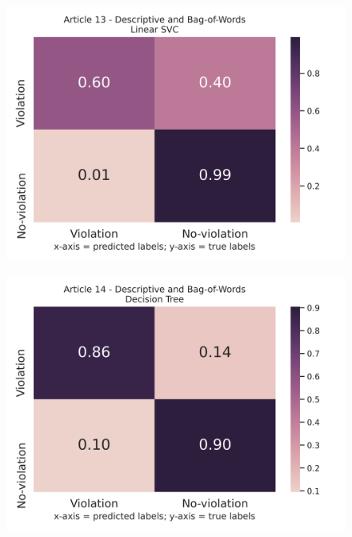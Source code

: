 \documentclass{article}
\begin{document}
\begin{figure}[!htb]
	\centering
    \includegraphics[scale=0.5]{data/analysis/cm/binary_cm_normalized_test_article_13.png}  
\end{figure}
\begin{figure}[!htb]
	\centering
    \includegraphics[scale=0.5]{data/analysis/cm/binary_cm_normalized_test_article_14.png}  
\end{figure}
\end{document}
